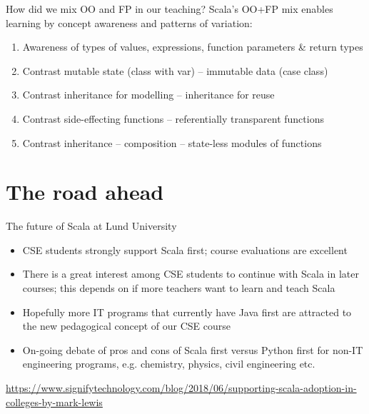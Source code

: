 \documentclass[aspectratio=169]{beamer}
\newcommand{\Section}[1]{\titleimagecolor{red}\section{#1}}
\newenvironment{Slide}[1]%
  {\begin{frame}[environment=Slide]{#1}}
  {\end{frame}}%
\begin{document}
\begin{Slide}{How did we mix OO and FP in our teaching?}
  Scala's OO+FP mix enables learning by concept awareness and patterns of variation:
  \begin{enumerate}
    \item Awareness of types of values, expressions, function parameters \& return types
    \item Contrast mutable state (class with var) -- immutable data (case class)
    \item Contrast inheritance for modelling -- inheritance for reuse
    \item Contrast side-effecting functions -- referentially transparent functions
    \item Contrast inheritance -- composition -- state-less modules of functions
  \end{enumerate}
\end{Slide}  


\Section{The road ahead}

\begin{Slide}{The future of Scala at Lund University}
\begin{itemize}
  \item CSE students strongly support Scala first; course evaluations are excellent
  \item There is a great interest among CSE students to continue with Scala in later courses; this depends on if more teachers want to learn and teach Scala 
  \item Hopefully more IT programs that currently have Java first are attracted to the new pedagogical concept of our CSE course
  \item On-going debate of pros and cons of Scala first versus Python first for non-IT engineering programs, e.g. chemistry, physics, civil engineering etc.
\end{itemize}  
\vfill \url{https://www.signifytechnology.com/blog/2018/06/supporting-scala-adoption-in-colleges-by-mark-lewis}
\end{Slide}
\end{document}
